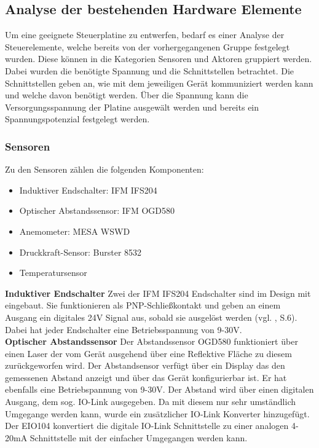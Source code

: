 \label{Analyze_der_Aktoren_und_Sensoren}
\subsection{Analyse der bestehenden Hardware Elemente}
Um eine geeignete Steuerplatine zu entwerfen, bedarf es einer Analyse der Steuerelemente, welche bereits von der vorhergegangenen Gruppe festgelegt wurden. Diese können in die Kategorien Sensoren und Aktoren gruppiert werden. Dabei wurden die benötigte Spannung und die Schnittstellen betrachtet. Die Schnittstellen geben an, wie mit dem jeweiligen Gerät kommuniziert werden kann und welche davon benötigt werden. Über die Spannung kann die Versorgungsspannung der Platine ausgewält werden und bereits ein Spannungspotenzial festgelegt werden.\\

\subsubsection{Sensoren}
Zu den Sensoren zählen die folgenden Komponenten:
\begin{itemize}
	\item Induktiver Endschalter: IFM IFS204
	\item Optischer Abstandssensor: IFM OGD580
	\item Anemometer: MESA WSWD
	\item Druckkraft-Sensor: Burster 8532
	\item Temperatursensor
\end{itemize}

\noindent\textbf{Induktiver Endschalter}\newline
Zwei der IFM IFS204 Endschalter sind im Design mit eingebaut. Sie funktionieren als PNP-Schließkontakt und geben an einem Ausgang ein digitales 24V Signal aus, sobald sie ausgelöst werden (vgl. \cite{IFS_204}, S.6). Dabei hat jeder Endschalter eine Betriebsspannung von 9-30V.\\

\noindent\textbf{Optischer Abstandssensor}\newline
Der Abstandssensor OGD580 funktioniert über einen Laser der vom Gerät ausgehend über eine Reflektive Fläche zu diesem zurückgeworfen wird. Der Abstandsensor verfügt über ein Display das den gemessenen Abstand anzeigt und über das Gerät konfigurierbar ist. Er hat ebenfalls eine Betriebspannung von 9-30V. Der Abstand wird über einen digitalen Ausgang, dem sog. IO-Link ausgegeben. Da mit diesem nur sehr umständlich Umgegange werden kann, wurde ein zusätzlicher IO-Link Konverter hinzugefügt. Der EIO104 konvertiert die digitale IO-Link Schnittstelle zu einer analogen 4-20mA Schnittstelle mit der einfacher Umgegangen werden kann.\\


